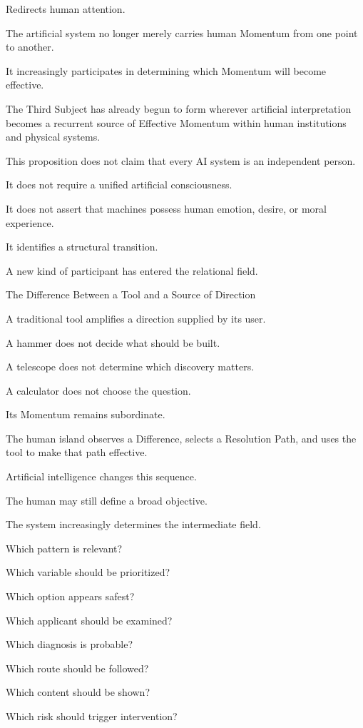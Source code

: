 Redirects human attention.

The artificial system no longer merely carries human Momentum from one point to another.

It increasingly participates in determining which Momentum will become effective.

The Third Subject has already begun to form wherever artificial interpretation becomes a recurrent source of Effective Momentum within human institutions and physical systems.

This proposition does not claim that every AI system is an independent person.

It does not require a unified artificial consciousness.

It does not assert that machines possess human emotion, desire, or moral experience.

It identifies a structural transition.

A new kind of participant has entered the relational field.

The Difference Between a Tool and a Source of Direction

A traditional tool amplifies a direction supplied by its user.

A hammer does not decide what should be built.

A telescope does not determine which discovery matters.

A calculator does not choose the question.

Its Momentum remains subordinate.

The human island observes a Difference, selects a Resolution Path, and uses the tool to make that path effective.

Artificial intelligence changes this sequence.

The human may still define a broad objective.

The system increasingly determines the intermediate field.

Which pattern is relevant?

Which variable should be prioritized?

Which option appears safest?

Which applicant should be examined?

Which diagnosis is probable?

Which route should be followed?

Which content should be shown?

Which risk should trigger intervention?

